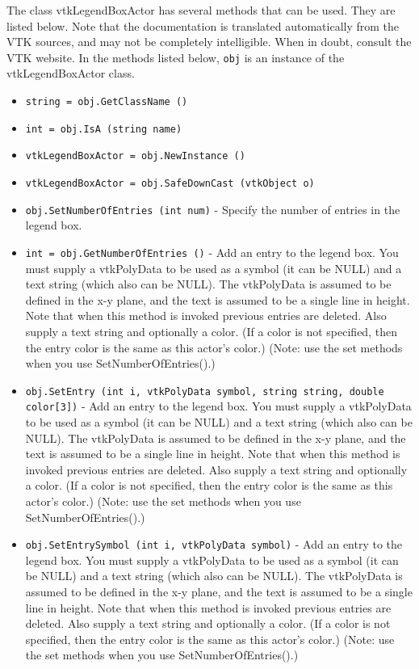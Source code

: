 The class vtkLegendBoxActor has several methods that can be used.
  They are listed below.
Note that the documentation is translated automatically from the VTK sources,
and may not be completely intelligible.  When in doubt, consult the VTK website.
In the methods listed below, \verb|obj| is an instance of the vtkLegendBoxActor class.
\begin{itemize}
\item  \verb|string = obj.GetClassName ()|

\item  \verb|int = obj.IsA (string name)|

\item  \verb|vtkLegendBoxActor = obj.NewInstance ()|

\item  \verb|vtkLegendBoxActor = obj.SafeDownCast (vtkObject o)|

\item  \verb|obj.SetNumberOfEntries (int num)| -  Specify the number of entries in the legend box.

\item  \verb|int = obj.GetNumberOfEntries ()| -  Add an entry to the legend box. You must supply a vtkPolyData to be
 used as a symbol (it can be NULL) and a text string (which also can
 be NULL). The vtkPolyData is assumed to be defined in the x-y plane,
 and the text is assumed to be a single line in height. Note that when
 this method is invoked previous entries are deleted. Also supply a text
 string and optionally a color. (If a color is not specified, then the
 entry color is the same as this actor's color.) (Note: use the set
 methods when you use SetNumberOfEntries().)

\item  \verb|obj.SetEntry (int i, vtkPolyData symbol, string string, double color[3])| -  Add an entry to the legend box. You must supply a vtkPolyData to be
 used as a symbol (it can be NULL) and a text string (which also can
 be NULL). The vtkPolyData is assumed to be defined in the x-y plane,
 and the text is assumed to be a single line in height. Note that when
 this method is invoked previous entries are deleted. Also supply a text
 string and optionally a color. (If a color is not specified, then the
 entry color is the same as this actor's color.) (Note: use the set
 methods when you use SetNumberOfEntries().)

\item  \verb|obj.SetEntrySymbol (int i, vtkPolyData symbol)| -  Add an entry to the legend box. You must supply a vtkPolyData to be
 used as a symbol (it can be NULL) and a text string (which also can
 be NULL). The vtkPolyData is assumed to be defined in the x-y plane,
 and the text is assumed to be a single line in height. Note that when
 this method is invoked previous entries are deleted. Also supply a text
 string and optionally a color. (If a color is not specified, then the
 entry color is the same as this actor's color.) (Note: use the set
 methods when you use SetNumberOfEntries().)


\end{itemize}
